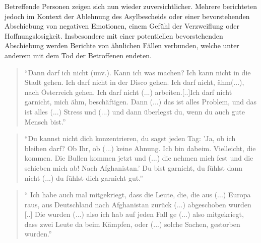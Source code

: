 Betreffende Personen zeigen sich nun wieder zuversichtlicher. Mehrere berichteten jedoch im Kontext der Ablehnung des Asylbescheids oder einer bevorstehenden Abschiebung von negativen Emotionen, einem Gefühl der Verzweiflung oder Hoffnungslosigkeit. Insbesondere mit einer potentiellen bevorstehenden Abschiebung werden Berichte von ähnlichen Fällen verbunden, welche unter anderem mit dem Tod der Betroffenen endeten.

\begin{quote}
    ``Dann darf ich nicht (unv.). Kann ich was machen? Ich kann nicht in die Stadt gehen. Ich darf nicht in der Disco gehen. Ich darf nicht, ähm(...), nach Österreich gehen. Ich darf nicht (...) arbeiten.[..]Ich darf nicht garnicht, mich ähm, beschäftigen. Dann (...) das ist alles Problem, und das ist alles (...) Stress und (...) und dann überlegst du, wenn du auch gute Mensch bist.''
\end{quote}
\begin{quote}
    ``Du kannst nicht dich konzentrieren, du sagst jeden Tag: 'Ja, ob ich bleiben darf? Ob Ihr, ob (...) keine Ahnung. Ich bin dabeim. Vielleicht, die kommen. Die Bullen kommen jetzt und (...) die nehmen mich fest und die schieben mich ab! Nach Afghanistan.' Du bist garnicht, du fühlst dann nicht (...) du fühlst dich garnicht gut.''
\end{quote}
\begin{quote}
    `` Ich habe auch mal mitgekriegt, dass die Leute, die, die aus (...) Europa raus, aus Deutschland nach Afghanistan zurück (...) abgeschoben wurden [..] Die wurden (...) also ich hab auf jeden Fall ge (...) also mitgekriegt, dass zwei Leute da beim Kämpfen, oder (...) solche Sachen, gestorben wurden.''
\end{quote}
